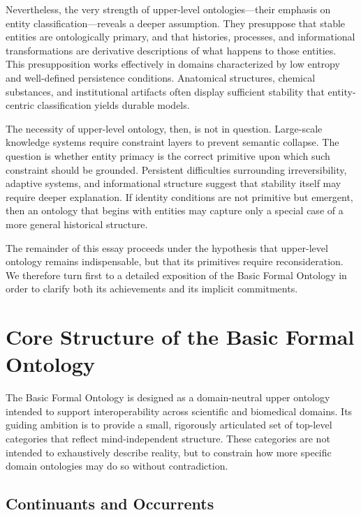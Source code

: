 \documentclass[12pt]{article}
\begin{document}
Nevertheless, the very strength of upper-level ontologies—their emphasis on entity classification—reveals a deeper assumption. They presuppose that stable entities are ontologically primary, and that histories, processes, and informational transformations are derivative descriptions of what happens to those entities. This presupposition works effectively in domains characterized by low entropy and well-defined persistence conditions. Anatomical structures, chemical substances, and institutional artifacts often display sufficient stability that entity-centric classification yields durable models.

The necessity of upper-level ontology, then, is not in question. Large-scale knowledge systems require constraint layers to prevent semantic collapse. The question is whether entity primacy is the correct primitive upon which such constraint should be grounded. Persistent difficulties surrounding irreversibility, adaptive systems, and informational structure suggest that stability itself may require deeper explanation. If identity conditions are not primitive but emergent, then an ontology that begins with entities may capture only a special case of a more general historical structure.

The remainder of this essay proceeds under the hypothesis that upper-level ontology remains indispensable, but that its primitives require reconsideration. We therefore turn first to a detailed exposition of the Basic Formal Ontology in order to clarify both its achievements and its implicit commitments.

\section{Core Structure of the Basic Formal Ontology}

The Basic Formal Ontology is designed as a domain-neutral upper ontology intended to support interoperability across scientific and biomedical domains. Its guiding ambition is to provide a small, rigorously articulated set of top-level categories that reflect mind-independent structure. These categories are not intended to exhaustively describe reality, but to constrain how more specific domain ontologies may do so without contradiction.

\subsection{Continuants and Occurrents}
\end{document}
